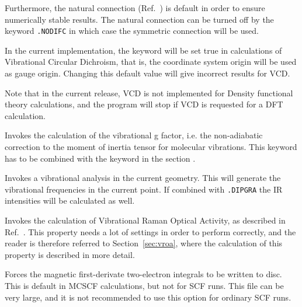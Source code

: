 \begin{description}
Furthermore, the natural connection
(Ref.~\cite{joklbkrthpjtca90,krthjopjklbcpl235}) is default in order to ensure
numerically stable results. The natural
connection can be turned off by the keyword \verb|.NODIFC| in which
case the symmetric connection will be used.


In the current implementation, the keyword  will be set
true in calculations of Vibrational Circular Dichroism, that is, the
coordinate system origin will be used as gauge origin. Changing this
default value will give incorrect results for VCD.

Note that in the current release, VCD is not implemented for Density
functional theory calculations, and the program will stop if VCD is
requested for a DFT calculation.


\item[\Key{VIB\_G}] Invokes the calculation of the vibrational g factor,
i.e. the non-adiabatic correction to the moment of inertia tensor for
molecular vibrations.
This keyword has to be combined with the keyword  in the section .

\item[\Key{VIBANA}] Invokes a vibrational analysis in the current
geometry. This will generate the vibrational frequencies in the
current point. If combined with \verb|.DIPGRA| the IR intensities
will be calculated as well.

\item[\Key{VROA}] Invokes the calculation of Vibrational Raman
Optical Activity, as
described in Ref.~\cite{thkrklbpjjofd99}. This
property needs a lot of settings in order to perform correctly, and
the reader is therefore referred to Section~\ref{sec:vroa}, where the
calculation of this property is described in more detail.

\item[\Key{WRTINT}] Forces the magnetic first-derivate two-electron
integrals to be written to disc. This is default in MCSCF
calculations, but not for SCF runs. This file can be very large, and
it is not recommended to use this option for ordinary SCF runs.

\end{description}

